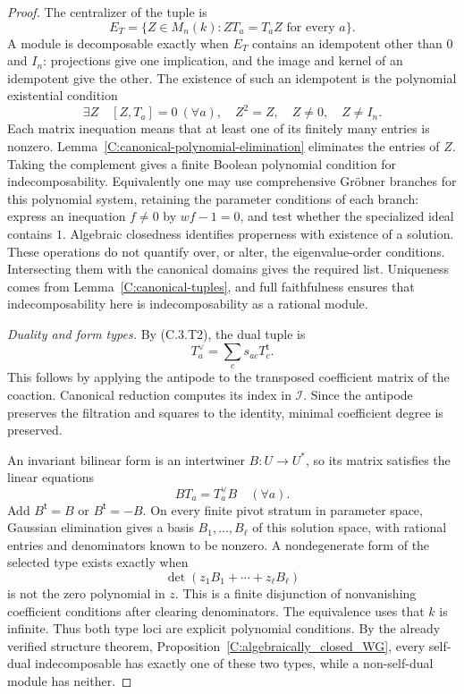 \begin{proof}
The centralizer of the tuple is
\[
 E_T=\{Z\in M_n(k):ZT_a=T_aZ\text{ for every }a\}.
                                                        \tag{C.3.T4}
\]
A module is decomposable exactly when $E_T$ contains an idempotent other
than $0$ and $I_n$: projections give one implication, and the image and
kernel of an idempotent give the other. The existence of such an
idempotent is the polynomial existential condition
\[
 \exists Z\quad
 [Z,T_a]=0\ (\forall a),\quad Z^2=Z,\quad Z\ne0,\quad Z\ne I_n.
                                                        \tag{C.3.T5}
\]
Each matrix inequation means that at least one of its finitely many
entries is nonzero. Lemma~\ref{C:canonical-polynomial-elimination} eliminates
the entries of $Z$. Taking the complement gives a finite Boolean
polynomial condition for indecomposability. Equivalently one may use
comprehensive Gr\"obner branches for this polynomial system, retaining
the parameter conditions of each branch: express an inequation $f\ne0$
by $wf-1=0$, and test whether the specialized ideal contains $1$.
Algebraic closedness identifies properness with existence of a solution.
These operations do not
quantify over, or alter, the eigenvalue-order conditions. Intersecting
them with the canonical domains gives the required list. Uniqueness
comes from Lemma~\ref{C:canonical-tuples}, and full faithfulness ensures
that indecomposability here is indecomposability as a rational module.

\emph{Duality and form types.}
By (C.3.T2), the dual tuple is
\[
             T^\vee_a=\sum_c s_{ac}T_c^{\mathsf t}.        \tag{C.3.T6}
\]
This follows by applying the antipode to the transposed coefficient
matrix of the coaction. Canonical reduction computes its index in
$\mathscr I$. Since the antipode preserves the filtration and squares
to the identity, minimal coefficient degree is preserved.

An invariant bilinear form is an intertwiner $B:U\to U^*$, so its matrix
satisfies the linear equations
\[
 BT_a=T^\vee_a B\quad(\forall a).
                                                        \tag{C.3.T7}
\]
Add $B^{\mathsf t}=B$ or $B^{\mathsf t}=-B$. On every finite pivot stratum
in parameter space, Gaussian elimination gives a basis
$B_1,\ldots,B_\ell$ of this solution space, with rational entries and
denominators known to be nonzero. A nondegenerate form of the selected
type exists exactly when
\[
              \det(z_1B_1+\cdots+z_\ell B_\ell)
\]
is not the zero polynomial in $z$. This is a finite disjunction of
nonvanishing coefficient conditions after clearing denominators.
The equivalence uses that $k$ is infinite. Thus both type loci are
explicit polynomial conditions. By the already verified structure
theorem, Proposition~\ref{C:algebraically_closed_WG}, every self-dual
indecomposable has exactly one of these two types, while a non-self-dual
module has neither.


\end{proof}
